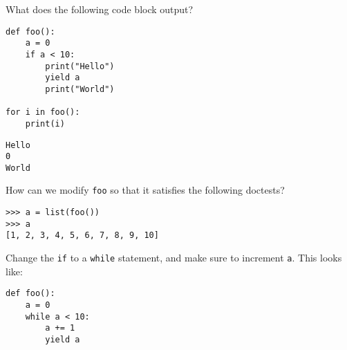\begin{blocksection}
\question What does the following code block output?

\begin{lstlisting}
def foo():
    a = 0
    if a < 10:
        print("Hello")
        yield a
        print("World")

for i in foo():
    print(i)
\end{lstlisting}

\begin{solution}[0.75in]
\begin{lstlisting}
Hello
0
World
\end{lstlisting}
\end{solution}
\end{blocksection}

\begin{blocksection}
\question How can we modify \lstinline$foo$ so that it satisfies the following doctests?
\begin{lstlisting}
>>> a = list(foo())
>>> a
[1, 2, 3, 4, 5, 6, 7, 8, 9, 10]
\end{lstlisting}

\begin{solution}[0.50in]
Change the \lstinline$if$ to a \lstinline$while$ statement, and make sure to increment
\lstinline$a$. This looks like:

\begin{lstlisting}
def foo():
    a = 0
    while a < 10:
        a += 1
        yield a
\end{lstlisting}
\end{solution}
\end{blocksection}
